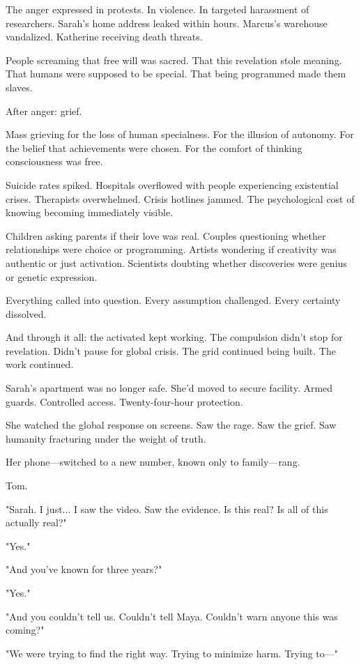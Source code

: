 The anger expressed in protests. In violence. In targeted harassment of researchers. Sarah's home address leaked within hours. Marcus's warehouse vandalized. Katherine receiving death threats.

People screaming that free will was sacred. That this revelation stole meaning. That humans were supposed to be special. That being programmed made them slaves.

After anger: grief.

Mass grieving for the loss of human specialness. For the illusion of autonomy. For the belief that achievements were chosen. For the comfort of thinking consciousness was free.

Suicide rates spiked. Hospitals overflowed with people experiencing existential crises. Therapists overwhelmed. Crisis hotlines jammed. The psychological cost of knowing becoming immediately visible.

Children asking parents if their love was real. Couples questioning whether relationships were choice or programming. Artists wondering if creativity was authentic or just activation. Scientists doubting whether discoveries were genius or genetic expression.

Everything called into question. Every assumption challenged. Every certainty dissolved.

And through it all: the activated kept working. The compulsion didn't stop for revelation. Didn't pause for global crisis. The grid continued being built. The work continued.

\scenebreak

Sarah's apartment was no longer safe. She'd moved to secure facility. Armed guards. Controlled access. Twenty-four-hour protection.

She watched the global response on screens. Saw the rage. Saw the grief. Saw humanity fracturing under the weight of truth.

Her phone—switched to a new number, known only to family—rang.

Tom.

"Sarah. I just... I saw the video. Saw the evidence. Is this real? Is all of this actually real?"

"Yes."

"And you've known for three years?"

"Yes."

"And you couldn't tell us. Couldn't tell Maya. Couldn't warn anyone this was coming?"

"We were trying to find the right way. Trying to minimize harm. Trying to—"

